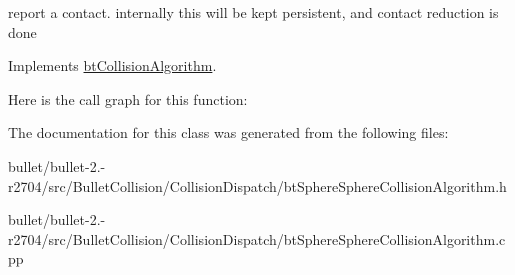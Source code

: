 report a contact. internally this will be kept persistent, and contact reduction is done 

Implements \hyperlink{classbt_collision_algorithm}{bt\+Collision\+Algorithm}.



Here is the call graph for this function\+:




The documentation for this class was generated from the following files\+:\begin{DoxyCompactItemize}
\item 
bullet/bullet-\/2.-\/r2704/src/\+Bullet\+Collision/\+Collision\+Dispatch/bt\+Sphere\+Sphere\+Collision\+Algorithm.\+h\item 
bullet/bullet-\/2.-\/r2704/src/\+Bullet\+Collision/\+Collision\+Dispatch/bt\+Sphere\+Sphere\+Collision\+Algorithm.\+cpp\end{DoxyCompactItemize}
